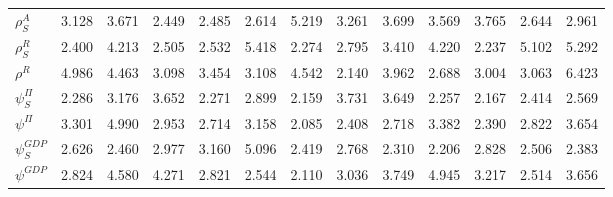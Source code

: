 \begin{center}
\begin{longtable}{lcccccccccccc}
$ {\rho^{A}_{S}}     $	 & 	       3.128	 & 	       3.671	 & 	       2.449	 & 	       2.485	 & 	       2.614	 & 	       5.219	 & 	       3.261	 & 	       3.699	 & 	       3.569	 & 	       3.765	 & 	       2.644	 & 	       2.961 \\ 
$ {\rho^{R}_{S}}     $	 & 	       2.400	 & 	       4.213	 & 	       2.505	 & 	       2.532	 & 	       5.418	 & 	       2.274	 & 	       2.795	 & 	       3.410	 & 	       4.220	 & 	       2.237	 & 	       5.102	 & 	       5.292 \\ 
$ {\rho^{R}}         $	 & 	       4.986	 & 	       4.463	 & 	       3.098	 & 	       3.454	 & 	       3.108	 & 	       4.542	 & 	       2.140	 & 	       3.962	 & 	       2.688	 & 	       3.004	 & 	       3.063	 & 	       6.423 \\ 
$ {\psi^{\Pi}_{S}}   $	 & 	       2.286	 & 	       3.176	 & 	       3.652	 & 	       2.271	 & 	       2.899	 & 	       2.159	 & 	       3.731	 & 	       3.649	 & 	       2.257	 & 	       2.167	 & 	       2.414	 & 	       2.569 \\ 
$ {\psi^{\Pi}}       $	 & 	       3.301	 & 	       4.990	 & 	       2.953	 & 	       2.714	 & 	       3.158	 & 	       2.085	 & 	       2.408	 & 	       2.718	 & 	       3.382	 & 	       2.390	 & 	       2.822	 & 	       3.654 \\ 
$ {\psi^{GDP}_{S}}   $	 & 	       2.626	 & 	       2.460	 & 	       2.977	 & 	       3.160	 & 	       5.096	 & 	       2.419	 & 	       2.768	 & 	       2.310	 & 	       2.206	 & 	       2.828	 & 	       2.506	 & 	       2.383 \\ 
$ {\psi^{GDP}}       $	 & 	       2.824	 & 	       4.580	 & 	       4.271	 & 	       2.821	 & 	       2.544	 & 	       2.110	 & 	       3.036	 & 	       3.749	 & 	       4.945	 & 	       3.217	 & 	       2.514	 & 	       3.656 \\ 
\end{longtable}
 \end{center}
